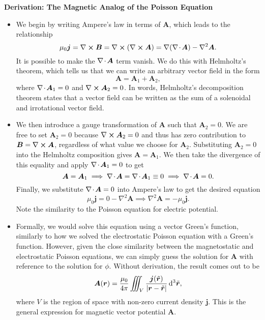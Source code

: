 \documentclass[11pt, a4paper]{article}
\newcommand{\diff}{\mathop{}\!\mathrm{d}} %
\newcommand{\dtr}{\diff^{3} \tilde{\r}}  %
\renewcommand{\vec}[1]{\bm{#1}} %
\renewcommand{\t}[1]{\tilde{#1}} %
\renewcommand{\r}{\vec{r}}
\newcommand{\B}{\vec{B}} %
\newcommand{\A}{\vec{A}} %
\newcommand{\mm}{\mu_{0}}  %
\renewcommand{\j}{\vec{j}}  %
\renewcommand{\div}{\nabla \mspace{-2mu} \cdot \mspace{-2mu}}
\renewcommand{\curl}{\nabla \cross}
\renewcommand{\grad}{\nabla}
\renewcommand{\laplacian}{\nabla^{2}}
\begin{document}
\textbf{Derivation: The Magnetic Analog of the Poisson Equation} \label{ss:magnetic-poisson}
\begin{itemize}

    \item We begin by writing Ampere's law in terms of $ \A $, which leads to the relationship
	\begin{equation*}
		\mm \j = \curl \B = \curl (\curl \A) = \grad (\div \A) - \laplacian \A.
	\end{equation*}
	It is possible to make the $ \div \A $ term vanish. We do this with Helmholtz's theorem, which tells us that we can write an arbitrary vector field in the form
	\begin{equation*}
		\A = \A_{1} + \A_{2},
	\end{equation*}
	where $ \div \A_{1} = 0 $ and $ \curl \A_{2} = 0 $. In words, Helmholtz's decomposition theorem states that a vector field can be written as the sum of a solenoidal and irrotational vector field.
	
    \item We then introduce a gauge transformation of $ \A $ such that $ \A_{2} = 0 $. We are free to set $ \A_{2} = 0 $ because $ \curl \A_{2} = 0 $ and thus has zero contribution to $ \B = \curl \A $, regardless of what value we choose for $ \A_{2} $. Substituting $ \A_{2} = 0 $ into the Helmholtz composition gives $ \A = \A_{1} $. We then take the divergence of this equality and apply $ \div \A_{1} = 0 $ to get
    \begin{equation*}
        \A = \A_{1} \implies \div \A = \div \A_{1} \equiv 0 \implies \div \A = 0.
    \end{equation*}
    Finally, we substitute $ \div \A = 0 $ into Ampere's law to get the desired equation
    \begin{equation*}
        \mm \j = 0 - \laplacian \A \implies \laplacian \A = - \mm \j.
    \end{equation*}
	Note the similarity to the Poisson equation for electric potential.
	
    \item Formally, we would solve this equation using a vector Green's function, similarly to how we solved the electrostatic Poisson equation with a Green's function. However, given the close similarity between the magnetostatic and electrostatic Poisson equations, we can simply guess the solution for $ \A $ with reference to the solution for $ \phi $. Without derivation, the result comes out to be
	\begin{equation*}
		\A(\r) = \frac{\mm}{4\pi} \iiint_{V} \frac{\j(\t{\r})}{\abs{\r - \t{\r}}} \dtr,
	\end{equation*}
	where $ V $ is the region of space with non-zero current density $ \j $. This is the general expression for magnetic vector potential $ \A $. 
	
\end{itemize}
\end{document}
